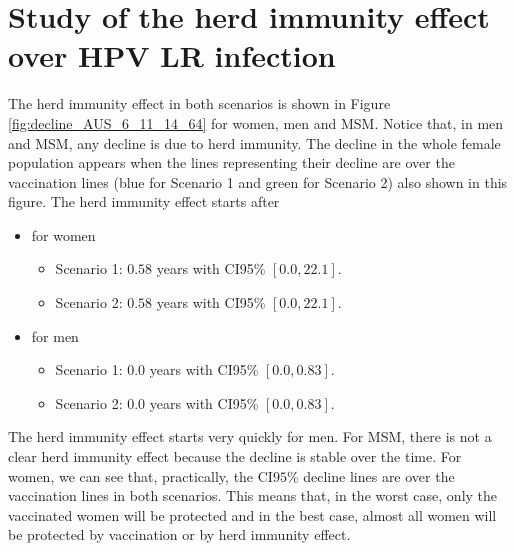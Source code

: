 \section{Study of the herd immunity effect over HPV LR infection}
The herd immunity effect in both scenarios is shown in Figure \ref{fig:decline_AUS_6_11_14_64} for women, men and MSM. Notice that, in men and MSM, any decline is due to herd immunity. The decline in the whole female population appears when the lines representing their decline are over the vaccination lines (blue for Scenario 1 and green for Scenario 2) also shown in this figure. The herd immunity effect starts after 

\begin{itemize}
	\item for women
	\begin{itemize}
		\item Scenario 1: $0.58$ years with CI95\% $[0.0, 22.1]$.
		\item Scenario 2: $0.58$ years with CI95\% $[0.0, 22.1]$.
	\end{itemize}
	\item for men
	\begin{itemize}
		\item Scenario 1: $0.0$ years with CI95\% $[0.0,0.83]$.
		\item Scenario 2: $0.0$ years with CI95\% $[0.0,0.83]$.	
	\end{itemize}
\end{itemize}

The herd immunity effect starts very quickly for men. For MSM, there is not a clear herd immunity effect because the decline is stable over the time. For women, we can see that, practically, the CI$95\%$ decline lines are over the vaccination lines in both scenarios. This means that, in the worst case, only the vaccinated women will be protected and in the best case, almost all women will be protected by vaccination or by herd immunity effect.

